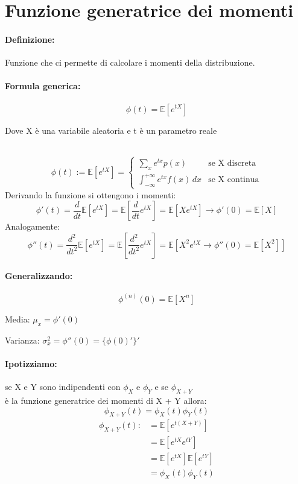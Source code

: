 \documentclass[]{article}
\newcommand{\ev}{\mathbb{E}[X]}
\renewcommand{\ev}[1]{\mathbb{E}[#1]}
\newcommand{\definizione}{\paragraph{Definizione:}}
\newcommand{\formula}{\paragraph{Formula generica:}}
\begin{document}
    \section{Funzione generatrice dei momenti}
    \definizione Funzione che ci permette di calcolare i momenti della distribuzione.
    \formula \[ \phi(t) = \ev{e^{tX}}\]
    \centerline{Dove X è una variabile aleatoria e t è un parametro reale} \\
    \begin{equation*}
        \phi(t) := \ev{e^{tX}} = 
        \displaystyle
        \begin{cases}
            \displaystyle \sum_{x}^{} e^{tx}p(x) & \text{se X discreta} \\
            \displaystyle \int_{-\infty}^{+\infty} e^{tx} f(x) \, dx & \text{se X continua}
        \end{cases}
    \end{equation*}
    \linebreak[10]
    Derivando la funzione si ottengono i momenti:
    \[ \phi'(t) = \frac{d}{dt} \ev{e^{tX}} = \ev{\frac{d}{dt} e^{tX}} = \ev{Xe^{tX}} \longrightarrow \phi'(0) = \ev{X}\]
    \linebreak[10]
    Analogamente:
    \[ \phi''(t) = \frac{d^2}{dt^2} \ev{e^{tX}} = \ev{\frac{d^2}{dt^2} e^{tX}} = \ev{X^2e^{tX} \longrightarrow \phi''(0) = \ev{X^2}}\]

    \paragraph{Generalizzando:} \[ \phi^{(n)}(0) = \ev{X^n} \]
    \begin{minipage}{0.45\linewidth}
        Media:
        $ \mu_x = \phi'(0) $
    \end{minipage}
    \begin{minipage}{0.45\linewidth}
        Varianza:
        $ \sigma^{2}_x = \phi''(0) = \{\phi(0)'\}' $
    \end{minipage}

    \paragraph{Ipotizziamo:} se X e Y sono indipendenti con $\phi_X$ e $\phi_Y$ e se $\phi_{X + Y}$ \\
    è la funzione generatrice dei momenti di X + Y allora:
    \[ \phi_{X + Y}(t) = \phi_X(t) \phi_Y(t) \]
    \begin{equation*}
        \begin{split}
            \phi_{X + Y}(t) :&= \ev{e^{t(X + Y)}} \\
            & = \ev{e^{tX} e^{tY}} \\
            & = \ev{e^{tX}} \ev{e^{tY}} \\
            & = \phi_X(t) \phi_Y(t)
        \end{split}
    \end{equation*}
\end{document}
